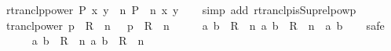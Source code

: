 \begin{isabellebody}
\endisatagproof
{\isafoldproof}%
%
\isadelimproof
\isanewline
%
\endisadelimproof
\isanewline
{}\isamarkupfalse%
\ rtranclp{\isacharunderscore}{\kern0pt}power{\isacharcolon}{\kern0pt}\ {\isachardoublequoteopen}{\isacharparenleft}{\kern0pt}P\isactrlsup {\isacharasterisk}{\kern0pt}\isactrlsup {\isacharasterisk}{\kern0pt}{\isacharparenright}{\kern0pt}\ x\ y\ {\isasymlongleftrightarrow}\ {\isacharparenleft}{\kern0pt}{\isasymexists}n{\isachardot}{\kern0pt}\ {\isacharparenleft}{\kern0pt}P\ {\isacharcircum}{\kern0pt}{\isacharcircum}{\kern0pt}\ n{\isacharparenright}{\kern0pt}\ x\ y{\isacharparenright}{\kern0pt}{\isachardoublequoteclose}\isanewline
%
\isadelimproof
\ \ %
\endisadelimproof
%
\isatagproof
{}\isamarkupfalse%
\ {\isacharparenleft}{\kern0pt}simp\ add{\isacharcolon}{\kern0pt}\ rtranclp{\isacharunderscore}{\kern0pt}is{\isacharunderscore}{\kern0pt}Sup{\isacharunderscore}{\kern0pt}relpowp{\isacharparenright}{\kern0pt}%
\endisatagproof
{\isafoldproof}%
%
\isadelimproof
\isanewline
%
\endisadelimproof
\isanewline
{}\isamarkupfalse%
\ trancl{\isacharunderscore}{\kern0pt}power{\isacharcolon}{\kern0pt}\ {\isachardoublequoteopen}p\ {\isasymin}\ R\isactrlsup {\isacharplus}{\kern0pt}\ {\isasymlongleftrightarrow}\ {\isacharparenleft}{\kern0pt}{\isasymexists}n\ {\isachargreater}{\kern0pt}\ {}{\isachardot}{\kern0pt}\ p\ {\isasymin}\ R\ {\isacharcircum}{\kern0pt}{\isacharcircum}{\kern0pt}\ n{\isacharparenright}{\kern0pt}{\isachardoublequoteclose}\isanewline
%
\isadelimproof
%
\endisadelimproof
%
\isatagproof
{}\isamarkupfalse%
\ {\isacharminus}{\kern0pt}\isanewline
\ \ \isamarkupfalse%
\ {\isachardoublequoteopen}{\isacharparenleft}{\kern0pt}a{\isacharcomma}{\kern0pt}\ b{\isacharparenright}{\kern0pt}\ {\isasymin}\ R\isactrlsup {\isacharplus}{\kern0pt}\ {\isasymlongleftrightarrow}\ {\isacharparenleft}{\kern0pt}{\isasymexists}n{\isachargreater}{\kern0pt}{}{\isachardot}{\kern0pt}\ {\isacharparenleft}{\kern0pt}a{\isacharcomma}{\kern0pt}\ b{\isacharparenright}{\kern0pt}\ {\isasymin}\ R\ {\isacharcircum}{\kern0pt}{\isacharcircum}{\kern0pt}\ n{\isacharparenright}{\kern0pt}{\isachardoublequoteclose}\ \ a\ b\isanewline
\ \ \isamarkupfalse%
\ safe\isanewline
\ \ \ \ \isamarkupfalse%
\ {\isachardoublequoteopen}{\isacharparenleft}{\kern0pt}a{\isacharcomma}{\kern0pt}\ b{\isacharparenright}{\kern0pt}\ {\isasymin}\ R\isactrlsup {\isacharplus}{\kern0pt}\ {\isasymLongrightarrow}\ {\isasymexists}n{\isachargreater}{\kern0pt}{}{\isachardot}{\kern0pt}\ {\isacharparenleft}{\kern0pt}a{\isacharcomma}{\kern0pt}\ b{\isacharparenright}{\kern0pt}\ {\isasymin}\ R\ {\isacharcircum}{\kern0pt}{\isacharcircum}{\kern0pt}\ n{\isachardoublequoteclose}\isanewline

\end{isabellebody}
